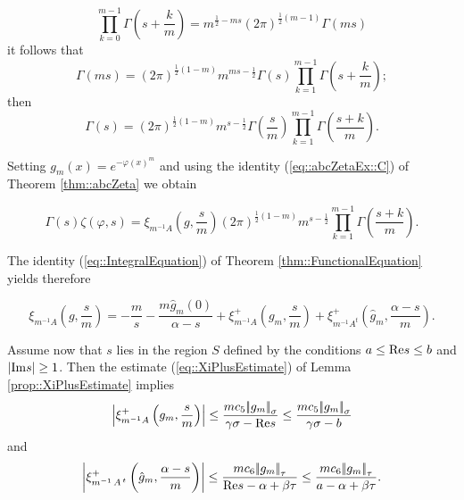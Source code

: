 \documentclass[12pt,a4paper]{amsart}
\begin{document}
{\begin{equation}\nonumber
\prod_{{k}=0}^{{m}-1}\Gamma\left({s}+\frac{k}{m}\right)
={m}^{\frac{1}{2}-{m}{s}}
(2\pi)^{\frac{1}{2}({m}-1)}\Gamma({m}{s})
\end{equation}
it follows that
\begin{equation}\nonumber
\Gamma({m}{s})=
(2\pi)^{\frac{1}{2}(1-{m})}
{m}^{{m}{s}-\frac{1}{2}}
\Gamma({s})
\prod_{{k}=1}^{{m}-1}\Gamma\left({s}+\frac{k}{m}\right);
\end{equation}
then
\begin{equation}\nonumber
\Gamma({s})=
(2\pi)^{\frac{1}{2}(1-{m})}
{m}^{{s}-\frac{1}{2}}
\Gamma\left(\frac{s}{m}\right)
\prod_{{k}=1}^{{m}-1}\Gamma\left(\frac{{s}+{k}}{m}\right).
\end{equation}

Setting ${g}_{m}({x})=e^{-{\varphi}({x})^{m}}$ and
using the identity (\ref{eq::abcZetaEx::C})
of Theorem \ref{thm::abcZeta} we obtain

\begin{equation}\nonumber
\Gamma({s}){\zeta}({\varphi},{s})=
{{\xi}_{{m}^{-1}{A}}\left({g},{\frac{s}{m}}\right)}
(2\pi)^{\frac{1}{2}(1-{m})}
{m}^{{s}-\frac{1}{2}}
\prod_{{k}=1}^{{m}-1}\Gamma\left(\frac{{s}+{k}}{m}\right).
\end{equation}

The identity (\ref{eq::IntegralEquation})
of Theorem \ref{thm::FunctionalEquation} yields therefore

\begin{equation}\nonumber
{{\xi}_{{m}^{-1}{A}}\left({g},{\frac{s}{m}}\right)}=
-\frac{m}{s}
-\frac{{m}\hat{g}_{m}(0)}{{\alpha}-{s}}
+{{\xi}_{{m}^{-1}{A}}^+\left({{g}_{m}},{\frac{s}{m}}\right)}
+{{\xi}_{{m}^{-1}{{\left.{{A}}\right.}^t}}^+\left({\hat{g}_{m}},{
		\frac{{\alpha}-{s}}{m}}\right)}.
\end{equation}

Assume now that ${s}$
lies in the region ${S}$
defined by the conditions
${a}\leq{\mathop{\rm Re}\nolimits}{s}\leq{b}$
and ${\left|{{\mathop{\rm Im}\nolimits}{s}}\right|}\geq 1$.
Then the estimate (\ref{eq::XiPlusEstimate})
of Lemma \ref{prop::XiPlusEstimate} 
implies
\begin{equation}\nonumber
{\left|{{{\xi}_{{m}^{-1}{A}}^+\left({{g}_{m}},{\frac{s}{m}}\right)}}\right|}
\leq
\frac{{m}{c}_5{{\left|\!\left|{{g}_{m}}\right|\!\right|}_{\sigma}}}{{\gamma}{\sigma}-{\mathop{\rm Re}\nolimits}{s}}
\leq
\frac{{m}{c}_5{{\left|\!\left|{{g}_{m}}\right|\!\right|}_{\sigma}}}{{\gamma}{\sigma}-{b}}
\end{equation}
and
\begin{equation}\nonumber
{\left|{{{\xi}_{{m}^{-1}{{\left.{{A}}\right.}^t}}^+\left({\hat{g}_{m}},{
		\frac{{\alpha}-{s}}{m}}\right)}}\right|}
\leq
\frac{{m}{c}_6{{\left|\!\left|{{g}_{m}}\right|\!\right|}_{{\tau}}}}{{\mathop{\rm Re}\nolimits}{s}-{\alpha}+{\beta}{\tau}}
\leq
\frac{{m}{c}_6{{\left|\!\left|{{g}_{m}}\right|\!\right|}_{{\tau}}}}{{a}-{\alpha}+{\beta}{\tau}}.
\end{equation}

}
\end{document}
